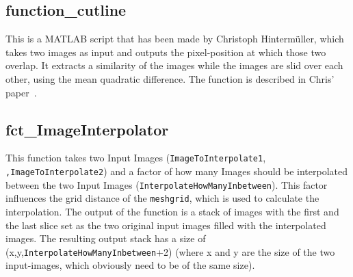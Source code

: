 \documentclass[a4paper]{scrartcl}
\begin{document}
\subsection{function_cutline}
This is a MATLAB script that has been made by Christoph Hintermüller, which takes two images as input and outputs the pixel-position at which those two overlap. It extracts a similarity of the images while the images are slid over each other, using the mean quadratic difference. The function is described in Chris' paper~\cite{Hintermueller2009}.

\subsection{fct_ImageInterpolator}
This function takes two Input Images (\verb+ImageToInterpolate1+, \verb+,ImageToInterpolate2+) and a factor of how many Images should be interpolated between the two Input Images (\verb+InterpolateHowManyInbetween+). This factor influences the grid distance of the \verb+meshgrid+, which is used to calculate the interpolation. The output of the function is a stack of images with the first and the last slice set as the two original input images filled with the interpolated images. The resulting output stack has a size of (x,y,\verb+InterpolateHowManyInbetween++2) (where x and y are the size of the two input-images, which obviously need to be of the same size).
\end{document}

